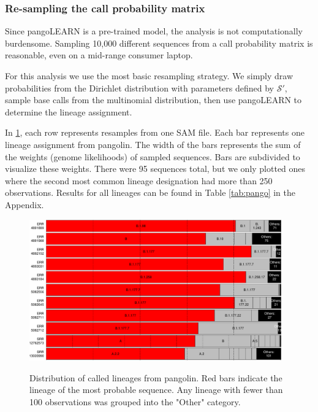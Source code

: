\documentclass[
]{article}
\newcommand{\nps}{\mathcal{S}} %
\begin{document}
\hypertarget{re-sampling-the-call-probability-matrix}{%
\subsubsection{Re-sampling the call probability
matrix}\label{re-sampling-the-call-probability-matrix}}

Since pangoLEARN is a pre-trained model, the analysis is not
computationally burdensome. Sampling 10,000 different sequences from a
call probability matrix is reasonable, even on a mid-range consumer
laptop.

For this analysis we use the most basic resampling strategy. We simply
draw probabilities from the Dirichlet distribution with parameters
defined by \(\nps'\), sample base calls from the multinomial
distribution, then use pangoLEARN to determine the lineage assignment.

In \ref{fig:covidcalls}, each row represents resamples from one SAM
file. Each bar represents one lineage assignment from pangolin. The
width of the bars represents the sum of the weights (genome likelihoods)
of sampled sequences. Bars are subdivided to visualize these weights.
There were 95 sequences total, but we only plotted ones where the second
most common lineage designation had more than 250 observations. Results
for all lineages can be found in Table \ref{tab:pango} in the Appendix.

\begin{figure}
\includegraphics[width = 0.97\textwidth]{../figures/pangolin_results_report_d_files/figure-latex/pareto-1.pdf}
\label{fig:covidcalls}
\caption{Distribution of called lineages from pangolin. Red bars indicate the lineage of the most probable sequence. Any lineage with fewer than 100 observations was grouped into the "Other" category.}
\end{figure}
\end{document}
